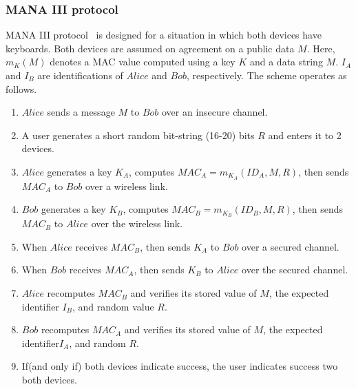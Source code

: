 \subsubsection*{MANA III protocol}

MANA III protocol~\cite{Mitchell:2004p25948} is designed for a situation in which both devices have keyboards. Both devices are assumed on agreement on a public data $M$. Here, $m_K(M)$ denotes a MAC value computed using a key $K$ and a data string $M$. $I_A$ and $I_B$ are identifications of $Alice$ and $Bob$, respectively. The scheme operates as follows. 

\begin{enumerate}
\item $Alice$ sends a message $M$ to $Bob$ over an insecure channel. 
\item A user generates a short random bit-string (16-20) bits $R$ and enters it to 2 devices.
\item $Alice$ generates a key $K_A$, computes $MAC_A = m_{K_A}(ID_A,M,R)$, then sends $MAC_A$ to $Bob$ over a wireless link.
\item $Bob$ generates a key $K_B$, computes $MAC_B = m_{K_B}(ID_B,M,R)$, then sends $MAC_B$ to $Alice$ over the wireless link.
\item When $Alice$ receives $MAC_B$, then sends $K_A$ to $Bob$ over a secured channel.
\item When $Bob$ receives $MAC_A$, then sends $K_B$ to $Alice$ over the secured channel.
\item $Alice$ recomputes $MAC_B$ and verifies its stored value of $M$, the expected identifier $I_B$, and random value $R$.
\item $Bob$ recomputes $MAC_A$ and verifies its stored value of $M$, the expected identifier$I_A$, and random $R$.
\item If(and only if) both devices indicate success, the user indicates success two both devices.
\end{enumerate}


